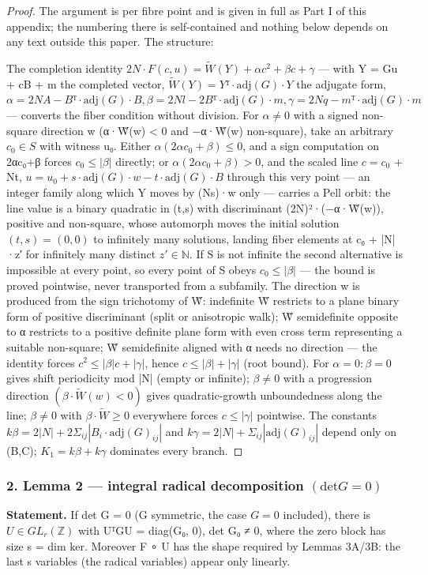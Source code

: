 \documentclass[11pt]{article}
\theoremstyle{plain}
\theoremstyle{definition}
\theoremstyle{remark}
\theoremstyle{plain}
\theoremstyle{definition}
\theoremstyle{remark}
\newcounter{Part}
\theoremstyle{plain}
\theoremstyle{definition}
\theoremstyle{remark}
\begin{document}
\begin{proof}
The argument is per fibre point and is given in full as Part I of this appendix; the numbering there is self-contained and nothing below depends on any text outside this paper. The structure:

The completion identity $2N·F(c,u) = \tilde{W}(Y) + αc^{2} + βc + γ$ — with Y = Gu + cB + m the completed vector, $\tilde{W}(Y) = Yᵀ·\mathrm{adj}(G)·Y$ the adjugate form, $α = 2NA − Bᵀ·\mathrm{adj}(G)·B, β = 2Nl − 2Bᵀ·\mathrm{adj}(G)·m, γ = 2Nq − mᵀ·\mathrm{adj}(G)·m$ — converts the fiber condition without division. For $α ≠ 0$ with a signed non-square direction w (α·W̃(w) < 0 and −α·W̃(w) non-square), take an arbitrary $c_{0} ∈ S$ with witness u₀. Either $α(2αc_{0}+β) ≤ 0$, and a sign computation on 2αc₀+β forces $c_{0} ≤ |β|$ directly; or $α(2αc_{0}+β) > 0$, and the scaled line $c = c_{0}$ + Nt, $u = u_{0} + s·\mathrm{adj}(G)·w − t·\mathrm{adj}(G)·B$ through this very point — an integer family along which Y moves by (Ns)·w only — carries a Pell orbit: the line value is a binary quadratic in (t,s) with discriminant (2N)²·(−α·W̃(w)), positive and non-square, whose automorph moves the initial solution $(t,s) = (0,0)$ to infinitely many solutions, landing fiber elements at c₀ + |N|·z′ for infinitely many distinct $z′ ∈ ℕ$. If S is not infinite the second alternative is impossible at every point, so every point of S obeys $c_{0} ≤ |β|$ — the bound is proved pointwise, never transported from a subfamily. The direction w is produced from the sign trichotomy of W̃: indefinite W̃ restricts to a plane binary form of positive discriminant (split or anisotropic walk); W̃ semidefinite opposite to α restricts to a positive definite plane form with even cross term representing a suitable non-square; W̃ semidefinite aligned with α needs no direction — the identity forces $c^{2} ≤ |β|c + |γ|$, hence $c ≤ |β| + |γ|$ (root bound). For $α = 0: β = 0$ gives shift periodicity mod |N| (empty or infinite); $β ≠ 0$ with a progression direction $(β·\tilde{W}(w) < 0)$ gives quadratic-growth unboundedness along the line; $β ≠ 0$ with $β·\tilde{W} ≥ 0$ everywhere forces $c ≤ |γ|$ pointwise. The constants $kβ = 2|N| + 2Σ_{ij}|B_{i}·\mathrm{adj}(G)_{ij}|$ and $kγ = 2|N| + Σ_{ij}|\mathrm{adj}(G)_{ij}|$ depend only on (B,C); $K_{1} = kβ + kγ$ dominates every branch.

\end{proof}
\subsubsection*{2. Lemma 2 — integral radical decomposition $(\mathrm{det} G = 0)$}
\textbf{Statement.} If det G = 0 (G symmetric, the case $G = 0$ included), there is $U ∈ GL_{r}(ℤ)$ with UᵀGU = diag(G₀, 0), det G₀ ≠ 0, where the zero block has size s = dim ker. Moreover F ∘ U has the shape required by Lemmas 3A/3B: the last s variables (the radical variables) appear only linearly.
\end{document}
